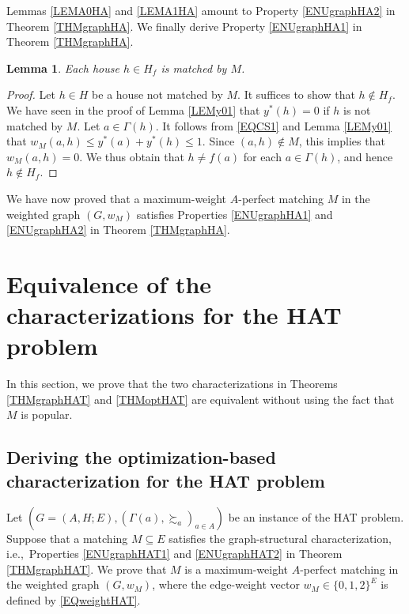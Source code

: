 \documentclass[11pt,a4paper,showkeys]{article}
\theoremstyle{plain}
\newtheorem{lemma}[theorem]{Lemma}
\theoremstyle{definition}
\begin{document}
Lemmas \ref{LEMA0HA} and \ref{LEMA1HA} amount to Property \ref{ENUgraphHA2} in Theorem \ref{THMgraphHA}. 
We finally derive Property \ref{ENUgraphHA1} in Theorem \ref{THMgraphHA}. 

\begin{lemma}
    Each house $h\in H_f$ is matched by $M$. 
\end{lemma}

\begin{proof}
    Let $h\in H$ be a house not matched by $M$. 
    It suffices to show that $h\not\in H_f$. 
    We have seen in the proof of Lemma \ref{LEMy01} that $y^*(h)=0$ if $h$ is not matched by $M$. 
    Let $a\in \Gamma(h)$. 
    It follows from \eqref{EQCS1} and Lemma \ref{LEMy01} that $w_M(a,h)\le y^*(a)+y^*(h) \le 1$. 
    Since $(a,h)\not \in M$, 
    this implies that $w_M(a,h) = 0$. 
    We thus obtain that $h\neq f(a)$ for each $a\in \Gamma(h)$, and hence $h\not\in H_f$. 
\end{proof}


We have now proved that 
a maximum-weight $A$-perfect matching $M$ in the weighted graph $(G,w_M)$ 
satisfies Properties \ref{ENUgraphHA1} and \ref{ENUgraphHA2} in Theorem \ref{THMgraphHA}. 


\section{Equivalence of the characterizations for the HAT problem}
\label{SECHAT}

In this section, 
we prove that the two characterizations in Theorems \ref{THMgraphHAT} and \ref{THMoptHAT} are equivalent 
without using the fact that $M$ is popular. 


\subsection{Deriving the optimization-based characterization  for the HAT problem}

Let $(G=(A,H;E),(\Gamma(a),\succsim_a)_{a\in A})$ be an instance of the 
HAT problem. 
Suppose that a matching $M\subseteq E$ satisfies 
the graph-structural characterization, 
i.e.,\ 
Properties \ref{ENUgraphHAT1} and \ref{ENUgraphHAT2} in 
Theorem \ref{THMgraphHAT}. 
We prove that $M$ is a maximum-weight $A$-perfect matching in the weighted graph $(G,w_M)$, 
where the edge-weight vector $w_M\in \{0,1,2\}^E$ is defined by \eqref{EQweightHAT}. 
\end{document}
